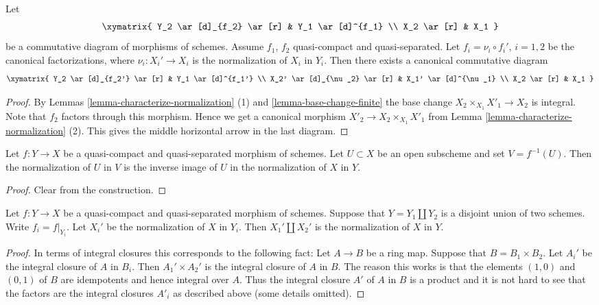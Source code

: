 \begin{lemma}
\label{lemma-functoriality-normalization}
Let
$$
\xymatrix{
Y_2 \ar[d]_{f_2} \ar[r] & Y_1 \ar[d]^{f_1} \\
X_2 \ar[r] & X_1
}
$$
be a commutative diagram of morphisms of schemes.
Assume $f_1$, $f_2$ quasi-compact and quasi-separated.
Let $f_i = \nu_i \circ f_i'$, $i = 1, 2$
be the canonical factorizations, where $\nu_i : X_i' \to X_i$ is
the normalization of $X_i$ in $Y_i$. Then there exists a
canonical commutative diagram
$$
\xymatrix{
Y_2 \ar[d]_{f_2'} \ar[r] & Y_1 \ar[d]^{f_1'} \\
X_2' \ar[d]_{\nu_2} \ar[r] & X_1' \ar[d]^{\nu_1} \\
X_2 \ar[r] & X_1
}
$$
\end{lemma}

\begin{proof}
By Lemmas \ref{lemma-characterize-normalization} (1)
and \ref{lemma-base-change-finite}
the base change $X_2 \times_{X_1} X'_1 \to X_2$
is integral. Note that $f_2$ factors through this morphism.
Hence we get a canonical morphism
$X'_2 \to X_2 \times_{X_1} X'_1$ from
Lemma \ref{lemma-characterize-normalization} (2).
This gives the middle horizontal arrow in the last diagram.
\end{proof}

\begin{lemma}
\label{lemma-normalization-localization}
Let $f : Y \to X$ be a quasi-compact and quasi-separated morphism of schemes.
Let $U \subset X$ be an open subscheme and set $V = f^{-1}(U)$.
Then the normalization of $U$ in $V$ is the inverse image of $U$
in the normalization of $X$ in $Y$.
\end{lemma}

\begin{proof}
Clear from the construction.
\end{proof}

\begin{lemma}
\label{lemma-normalization-in-disjoint-union}
Let $f : Y \to X$ be a quasi-compact and quasi-separated morphism of schemes.
Suppose that $Y = Y_1 \amalg Y_2$ is a disjoint union of two schemes.
Write $f_i = f|_{Y_i}$. Let $X_i'$ be the normalization of $X$ in $Y_i$.
Then $X_1' \amalg X_2'$ is the normalization of $X$ in $Y$.
\end{lemma}

\begin{proof}
In terms of integral closures this corresponds to the following fact:
Let $A \to B$ be a ring map. Suppose that $B = B_1 \times B_2$.
Let $A_i'$ be the integral closure of $A$ in $B_i$. Then
$A_1' \times A_2'$ is the integral closure of $A$ in $B$.
The reason this works is that the elements $(1, 0)$ and $(0, 1)$ of $B$
are idempotents and hence integral over $A$. Thus the integral closure
$A'$ of $A$ in $B$ is a product and it is not hard to see that the factors
are the integral closures $A'_i$ as described above (some details
omitted).
\end{proof}

